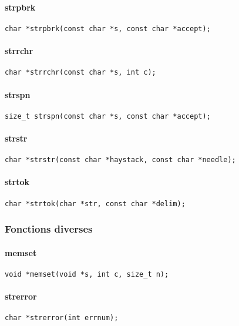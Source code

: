 \paragraph{strpbrk}
\begin{Verbatim}
char *strpbrk(const char *s, const char *accept);
\end{Verbatim}
\paragraph{strrchr}
\begin{Verbatim}
char *strrchr(const char *s, int c);
\end{Verbatim}
\paragraph{strspn}
\begin{Verbatim}
size_t strspn(const char *s, const char *accept);
\end{Verbatim}
\paragraph{strstr}
\begin{Verbatim}
char *strstr(const char *haystack, const char *needle);
\end{Verbatim}
\paragraph{strtok}
\begin{Verbatim}
char *strtok(char *str, const char *delim);
\end{Verbatim}

\subsubsection{Fonctions diverses}

\paragraph{memset}
\begin{Verbatim}
void *memset(void *s, int c, size_t n);
\end{Verbatim}
\paragraph{strerror}
\begin{Verbatim}
char *strerror(int errnum);
\end{Verbatim}

